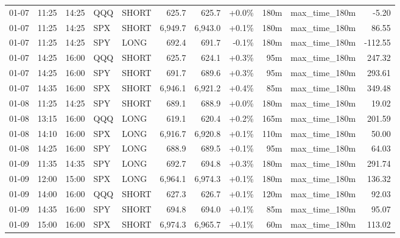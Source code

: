 \documentclass[11pt,a4paper,twoside]{article}
\begin{document}
\begin{center}
\begin{longtable}{>{\color{txtmain}}l l l l l r r r r >{\color{txtmain}}l r}
01-07 & 11:25 & 14:25 & QQQ & SHORT & 625.7 & 625.7 & \textcolor{wingreen}{+0.0\%} & 180m & max\_time\_180m & \textcolor{lossred}{-5.20} \\
01-07 & 11:25 & 14:25 & SPX & SHORT & 6,949.7 & 6,943.0 & \textcolor{wingreen}{+0.1\%} & 180m & max\_time\_180m & \textcolor{wingreen}{86.55} \\
01-07 & 11:25 & 14:25 & SPY & LONG & 692.4 & 691.7 & \textcolor{lossred}{-0.1\%} & 180m & max\_time\_180m & \textcolor{lossred}{-112.55} \\
01-07 & 14:25 & 16:00 & QQQ & SHORT & 625.7 & 624.1 & \textcolor{wingreen}{+0.3\%} & 95m & max\_time\_180m & \textcolor{wingreen}{247.32} \\
01-07 & 14:25 & 16:00 & SPY & SHORT & 691.7 & 689.6 & \textcolor{wingreen}{+0.3\%} & 95m & max\_time\_180m & \textcolor{wingreen}{293.61} \\
01-07 & 14:35 & 16:00 & SPX & SHORT & 6,946.1 & 6,921.2 & \textcolor{wingreen}{+0.4\%} & 85m & max\_time\_180m & \textcolor{wingreen}{349.48} \\
01-08 & 11:25 & 14:25 & SPY & SHORT & 689.1 & 688.9 & \textcolor{wingreen}{+0.0\%} & 180m & max\_time\_180m & \textcolor{wingreen}{19.02} \\
01-08 & 13:15 & 16:00 & QQQ & LONG & 619.1 & 620.4 & \textcolor{wingreen}{+0.2\%} & 165m & max\_time\_180m & \textcolor{wingreen}{201.59} \\
01-08 & 14:10 & 16:00 & SPX & LONG & 6,916.7 & 6,920.8 & \textcolor{wingreen}{+0.1\%} & 110m & max\_time\_180m & \textcolor{wingreen}{50.00} \\
01-08 & 14:25 & 16:00 & SPY & LONG & 688.9 & 689.5 & \textcolor{wingreen}{+0.1\%} & 95m & max\_time\_180m & \textcolor{wingreen}{64.03} \\
01-09 & 11:35 & 14:35 & SPY & LONG & 692.7 & 694.8 & \textcolor{wingreen}{+0.3\%} & 180m & max\_time\_180m & \textcolor{wingreen}{291.74} \\
01-09 & 12:00 & 15:00 & SPX & LONG & 6,964.1 & 6,974.3 & \textcolor{wingreen}{+0.1\%} & 180m & max\_time\_180m & \textcolor{wingreen}{136.32} \\
01-09 & 14:00 & 16:00 & QQQ & SHORT & 627.3 & 626.7 & \textcolor{wingreen}{+0.1\%} & 120m & max\_time\_180m & \textcolor{wingreen}{92.03} \\
01-09 & 14:35 & 16:00 & SPY & SHORT & 694.8 & 694.0 & \textcolor{wingreen}{+0.1\%} & 85m & max\_time\_180m & \textcolor{wingreen}{95.07} \\
01-09 & 15:00 & 16:00 & SPX & SHORT & 6,974.3 & 6,965.7 & \textcolor{wingreen}{+0.1\%} & 60m & max\_time\_180m & \textcolor{wingreen}{113.02} \\

\end{longtable}
\end{center}
\end{document}
